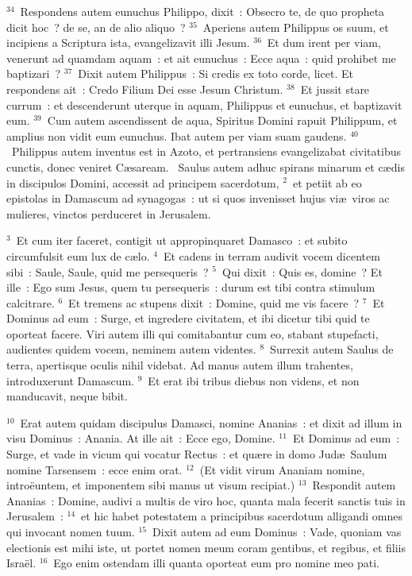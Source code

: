 ${}^{34}$~Respondens autem eunuchus Philippo, dixit~: Obsecro te, de quo propheta dicit hoc~? de se, an de alio aliquo~?
${}^{35}$~Aperiens autem Philippus os suum, et incipiens a Scriptura ista, evangelizavit illi Jesum.
${}^{36}$~Et dum irent per viam, venerunt ad quamdam aquam~: et ait eunuchus~: Ecce aqua~: quid prohibet me baptizari~?
${}^{37}$~Dixit autem Philippus~: Si credis ex toto corde, licet. Et respondens ait~: Credo Filium Dei esse Jesum Christum.
${}^{38}$~Et jussit stare currum~: et descenderunt uterque in aquam, Philippus et eunuchus, et baptizavit eum.
${}^{39}$~Cum autem ascendissent de aqua, Spiritus Domini rapuit Philippum, et amplius non vidit eum eunuchus. Ibat autem per viam suam gaudens.
${}^{40}$~Philippus autem inventus est in Azoto, et pertransiens evangelizabat civitatibus cunctis, donec veniret C\ae saream.
~\lettrine[lines=10,image=true,loversize=0.05,lraise=-0.03]{S}{}aulus autem adhuc spirans minarum et c\ae dis in discipulos Domini, accessit ad principem sacerdotum,
${}^{2}$~et petiit ab eo epistolas in Damascum ad synagogas~: ut si quos invenisset hujus vi\ae\ viros ac mulieres, vinctos perduceret in Jerusalem.


${}^{3}$~Et cum iter faceret, contigit ut appropinquaret Damasco~: et subito circumfulsit eum lux de c\ae lo.
${}^{4}$~Et cadens in terram audivit vocem dicentem sibi~: Saule, Saule, quid me persequeris~?
${}^{5}$~Qui dixit~: Quis es, domine~? Et ille~: Ego sum Jesus, quem tu persequeris~: durum est tibi contra stimulum calcitrare.
${}^{6}$~Et tremens ac stupens dixit~: Domine, quid me vis facere~?
${}^{7}$~Et Dominus ad eum~: Surge, et ingredere civitatem, et ibi dicetur tibi quid te oporteat facere. Viri autem illi qui comitabantur cum eo, stabant stupefacti, audientes quidem vocem, neminem autem videntes.
${}^{8}$~Surrexit autem Saulus de terra, apertisque oculis nihil videbat. Ad manus autem illum trahentes, introduxerunt Damascum.
${}^{9}$~Et erat ibi tribus diebus non videns, et non manducavit, neque bibit.


${}^{10}$~Erat autem quidam discipulus Damasci, nomine Ananias~: et dixit ad illum in visu Dominus~: Anania. At ille ait~: Ecce ego, Domine.
${}^{11}$~Et Dominus ad eum~: Surge, et vade in vicum qui vocatur Rectus~: et qu\ae re in domo Jud\ae\ Saulum nomine Tarsensem~: ecce enim orat.
${}^{12}$~(Et vidit virum Ananiam nomine, intro\"euntem, et imponentem sibi manus ut visum recipiat.)
${}^{13}$~Respondit autem Ananias~: Domine, audivi a multis de viro hoc, quanta mala fecerit sanctis tuis in Jerusalem~:
${}^{14}$~et hic habet potestatem a principibus sacerdotum alligandi omnes qui invocant nomen tuum.
${}^{15}$~Dixit autem ad eum Dominus~: Vade, quoniam vas electionis est mihi iste, ut portet nomen meum coram gentibus, et regibus, et filiis Isra\"el.
${}^{16}$~Ego enim ostendam illi quanta oporteat eum pro nomine meo pati.


